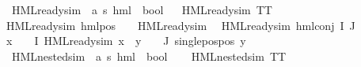 \begin{isabellebody}
\isanewline
{}\isamarkupfalse%
\ HML{\isacharunderscore}{\kern0pt}ready{\isacharunderscore}{\kern0pt}sim\ {\isacharcolon}{\kern0pt}{\isacharcolon}{\kern0pt}\ {\isachardoublequoteopen}{\isacharparenleft}{\kern0pt}{\isacharprime}{\kern0pt}a{\isacharcomma}{\kern0pt}\ {\isacharprime}{\kern0pt}s{\isacharparenright}{\kern0pt}\ hml\ {\isasymRightarrow}\ bool{\isachardoublequoteclose}\isanewline
\ \ \isanewline
{\isachardoublequoteopen}HML{\isacharunderscore}{\kern0pt}ready{\isacharunderscore}{\kern0pt}sim\ TT{\isachardoublequoteclose}\ {\isacharbar}{\kern0pt}\isanewline
{\isachardoublequoteopen}HML{\isacharunderscore}{\kern0pt}ready{\isacharunderscore}{\kern0pt}sim\ {\isacharparenleft}{\kern0pt}hml{\isacharunderscore}{\kern0pt}pos\ {\isasymalpha}\ {\isasymphi}{\isacharparenright}{\kern0pt}{\isachardoublequoteclose}\ \ {\isachardoublequoteopen}HML{\isacharunderscore}{\kern0pt}ready{\isacharunderscore}{\kern0pt}sim\ {\isasymphi}{\isachardoublequoteclose}\ {\isacharbar}{\kern0pt}\isanewline
{\isachardoublequoteopen}HML{\isacharunderscore}{\kern0pt}ready{\isacharunderscore}{\kern0pt}sim\ {\isacharparenleft}{\kern0pt}hml{\isacharunderscore}{\kern0pt}conj\ I\ J\ {\isasymPhi}{\isacharparenright}{\kern0pt}{\isachardoublequoteclose}\ \ \isanewline
{\isachardoublequoteopen}{\isacharparenleft}{\kern0pt}{\isasymforall}x\ {\isasymin}\ {\isacharparenleft}{\kern0pt}{\isasymPhi}\ {\isacharbackquote}{\kern0pt}\ I{\isacharparenright}{\kern0pt}{\isachardot}{\kern0pt}\ HML{\isacharunderscore}{\kern0pt}ready{\isacharunderscore}{\kern0pt}sim\ x{\isacharparenright}{\kern0pt}\ {\isasymand}\ {\isacharparenleft}{\kern0pt}{\isasymforall}y\ {\isasymin}\ {\isacharparenleft}{\kern0pt}{\isasymPhi}\ {\isacharbackquote}{\kern0pt}\ J{\isacharparenright}{\kern0pt}{\isachardot}{\kern0pt}\ single{\isacharunderscore}{\kern0pt}pos{\isacharunderscore}{\kern0pt}pos\ y{\isacharparenright}{\kern0pt}{\isachardoublequoteclose}\isanewline
\isanewline
{}\isamarkupfalse%
\ HML{\isacharunderscore}{\kern0pt}{}{\isacharunderscore}{\kern0pt}nested{\isacharunderscore}{\kern0pt}sim\ {\isacharcolon}{\kern0pt}{\isacharcolon}{\kern0pt}\ {\isachardoublequoteopen}{\isacharparenleft}{\kern0pt}{\isacharprime}{\kern0pt}a{\isacharcomma}{\kern0pt}\ {\isacharprime}{\kern0pt}s{\isacharparenright}{\kern0pt}\ hml\ {\isasymRightarrow}\ bool{\isachardoublequoteclose}\ \isanewline
\ \ \isanewline
{\isachardoublequoteopen}HML{\isacharunderscore}{\kern0pt}{}{\isacharunderscore}{\kern0pt}nested{\isacharunderscore}{\kern0pt}sim\ TT{\isachardoublequoteclose}\ {\isacharbar}{\kern0pt}\isanewline

\end{isabellebody}
